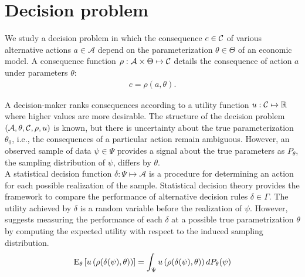 \section{Decision problem}
We study a decision problem in which the consequence $c \in \mathcal{C}$ of various alternative actions $a\in\mathcal{A}$ depend on the parameterization $\theta\in \Theta$ of an economic model. A consequence function $\rho: \mathcal{A} \times \Theta \mapsto \mathcal{C}$  details the consequence of action $a$ under parameters $\theta$:
%
\begin{align*}
c = \rho(a, \theta).
\end{align*}

A decision-maker ranks consequences according to a utility function $u: \mathcal{C} \mapsto \mathbb{R}$ where higher values are more desirable. The structure of the decision problem $(\mathcal{A}, \theta, \mathcal{C}, \rho, u)$ is known, but there is uncertainty about the true parameterization $\theta_0$, i.e., the consequences of a particular action remain ambiguous. However, an observed sample of data $\psi \in \Psi$ provides a signal about the true parameters as $P_{\theta}$, the sampling distribution of $\psi$, differs by $\theta$.\\

A statistical decision function $\delta: \Psi \mapsto \mathcal{A}$ is a procedure for determining an action for each possible realization of the sample.
Statistical decision theory provides the framework to compare the performance of alternative decision rules  $\delta \in \Gamma$. The utility achieved by $\delta$ is a random variable before the realization of $\psi$. However, \citet{Wald.1950} suggests measuring the performance of each $\delta$ at a possible true parametrization $\theta$ by computing the expected utility with respect to the induced sampling distribution.
%
\begin{align*}
  \mathrm{E}_{\theta}\left[u\left(\rho(\delta(\psi), \theta)\right)\right] = \int_\Psi u\left(\rho(\delta(\psi), \theta)\right) d P_{\theta}(\psi)
\end{align*}
%

